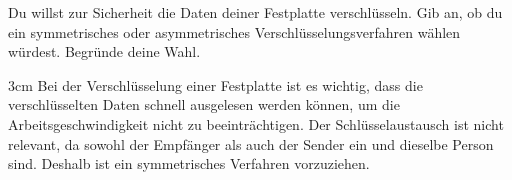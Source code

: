 \question[2]
Du willst zur Sicherheit die Daten deiner Festplatte verschlüsseln. Gib an, ob du ein symmetrisches oder
asymmetrisches Verschlüsselungsverfahren wählen würdest. Begründe deine Wahl. 

\begin{solutionbox}{3cm}
Bei der Verschlüsselung einer Festplatte ist es wichtig, dass die verschlüsselten Daten schnell ausgelesen
werden können, um die Arbeitsgeschwindigkeit nicht zu beeinträchtigen. Der Schlüsselaustausch
ist nicht relevant, da sowohl der Empfänger als auch der Sender ein und dieselbe Person sind.
Deshalb ist ein symmetrisches Verfahren vorzuziehen.
\end{solutionbox}